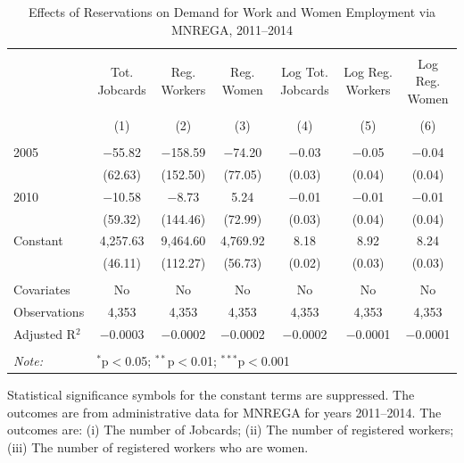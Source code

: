 \begin{table}
\centering
\begin{threeparttable}

  \caption{Effects of Reservations on Demand for Work and Women Employment via MNREGA, 2011--2014} 
  \label{mnrega_main_raj_bose} 
\scriptsize 
\begin{tabular}{@{\extracolsep{0pt}}lcccccc} 
\\[-1.8ex]\hline 
\hline \\[-1.8ex] 
 & Tot. Jobcards & Reg. Workers & Reg. Women & Log Tot. Jobcards & Log Reg. Workers & Log Reg. Women \\ 
\\[-1.8ex] & (1) & (2) & (3) & (4) & (5) & (6)\\ 
\hline \\[-1.8ex] 
 2005 & $-$55.82 & $-$158.59 & $-$74.20 & $-$0.03 & $-$0.05 & $-$0.04 \\ 
  & (62.63) & (152.50) & (77.05) & (0.03) & (0.04) & (0.04) \\ 
  2010 & $-$10.58 & $-$8.73 & 5.24 & $-$0.01 & $-$0.01 & $-$0.01 \\ 
  & (59.32) & (144.46) & (72.99) & (0.03) & (0.04) & (0.04) \\ 
  Constant & 4,257.63 & 9,464.60 & 4,769.92 & 8.18 & 8.92 & 8.24 \\ 
  & (46.11) & (112.27) & (56.73) & (0.02) & (0.03) & (0.03) \\ 
 \hline \\[-1.8ex] 
Covariates & No & No & No & No & No & No \\ 
Observations & 4,353 & 4,353 & 4,353 & 4,353 & 4,353 & 4,353 \\ 
Adjusted R$^{2}$ & $-$0.0003 & $-$0.0002 & $-$0.0002 & $-$0.0002 & $-$0.0001 & $-$0.0001 \\ 
\hline 
\hline \\[-1.8ex] 
\textit{Note:}  & \multicolumn{6}{l}{$^{*}$p$<$0.05; $^{**}$p$<$0.01; $^{***}$p$<$0.001} \\ 
\end{tabular} 
\begin{tablenotes}[flushleft]
\setlength{\itemindent}{0em}
\scriptsize
\item[] Statistical significance symbols for the constant terms are suppressed. The outcomes are from administrative data for MNREGA for years 2011--2014. 
                           The outcomes are: 
                     (i) The number of Jobcards; 
                     (ii) The number of registered workers;
                     (iii) The number of registered workers who are women.
\end{tablenotes}
\end{threeparttable}
\end{table}
